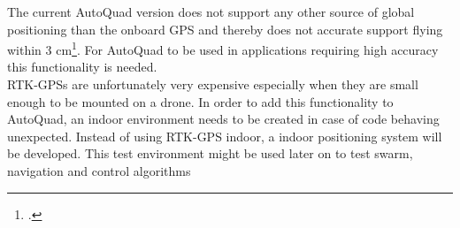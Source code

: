 The current AutoQuad version does not support any other source of global positioning than the onboard GPS and thereby does not accurate support flying within 3 cm\footcite{stempfhuber2011precise}. For AutoQuad to be used in applications requiring high accuracy this functionality is needed. \\
RTK-GPSs are unfortunately very expensive especially when they are small enough to be mounted on a drone. In order to add this functionality to AutoQuad, an indoor environment needs to be created in case of code behaving unexpected. Instead of using RTK-GPS indoor, a indoor positioning system will be developed. This test environment might be used later on to test swarm, navigation and control algorithms
